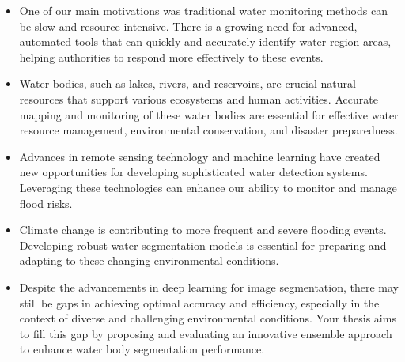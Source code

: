\begin{itemize}
        \item One of our main motivations was traditional water monitoring methods can be slow and resource-intensive. There is a growing need for advanced, automated tools that can quickly and accurately identify water region areas, helping authorities to respond more effectively to these events.
        \item Water bodies, such as lakes, rivers, and reservoirs, are crucial natural resources that support various ecosystems and human activities. Accurate mapping and monitoring of these water bodies are essential for effective water resource management, environmental conservation, and disaster preparedness.
        \item Advances in remote sensing technology and machine learning have created new opportunities for developing sophisticated water detection systems. Leveraging these technologies can enhance our ability to monitor and manage flood risks.
        \item Climate change is contributing to more frequent and severe flooding events. Developing robust water segmentation models is essential for preparing and adapting to these changing environmental conditions.
        \item Despite the advancements in deep learning for image segmentation, there may still be gaps in achieving optimal accuracy and efficiency, especially in the context of diverse and challenging environmental conditions. Your thesis aims to fill this gap by proposing and evaluating an innovative ensemble approach to enhance water body segmentation performance.
        

       
\end{itemize}
